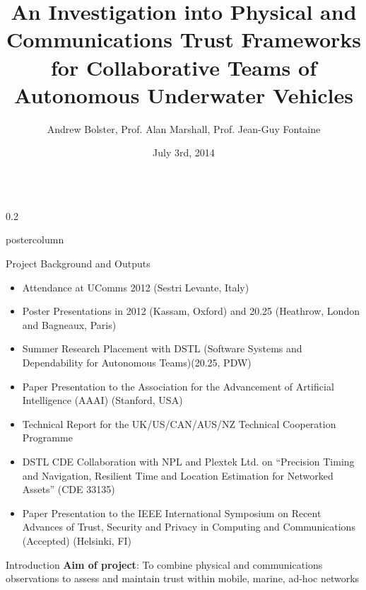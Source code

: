 \documentclass[final,hyperref={pdfpagelabels=false}]{beamer}
\title{\huge An Investigation into Physical and Communications Trust Frameworks \\
for Collaborative Teams of Autonomous Underwater Vehicles}
\author{Andrew Bolster, Prof. Alan Marshall, Prof. Jean-Guy Fontaine }
\institute[UoL]{Advanced Networks Research Group, University of Liverpool, UK}
\date[03/07/14]{July 3rd, 2014}
\def\colwidth{0.2\linewidth}
\begin{document}
\begin{frame}[fragile]
	\begin{columns}[T]
		
		\setlength{\parindent}{1em}
		\begin{column}{\colwidth}
			\begin{beamercolorbox}[center,wd=\textwidth]{postercolumn}
				\begin{minipage}[T]{.99\textwidth}  %
					\parbox[t]{\textwidth}{ %
						\begin{block}{Project Background and Outputs}
							\begin{itemize}
								\item Attendance at UComms 2012 (Sestri Levante, Italy)
								\item Poster Presentations in 2012 (Kassam, Oxford) and 20.25 (Heathrow, London and Bagneaux, Paris)
								\item Summer Research Placement with DSTL (Software Systems and Dependability for Autonomous Teams)(20.25, PDW)
								\item Paper Presentation to the Association for the Advancement of Artificial Intelligence (AAAI) (Stanford, USA) \cite{Bolster2014}
								\item Technical Report for the UK/US/CAN/AUS/NZ Technical Cooperation Programme \cite{Bolster2014a}
								\item DSTL CDE Collaboration with NPL and Plextek Ltd. on ``Precision Timing and Navigation, Resilient Time and Location Estimation for Networked Assets'' (CDE 33135)
                \item Paper Presentation to the IEEE International Symposium on Recent Advances of Trust, Security and Privacy in Computing and Communications (Accepted) (Helsinki, FI) \cite{Bolster2015}
							\end{itemize}
						\end{block}
												
						\begin{block}{Introduction}
							\textbf{Aim of project}: To combine physical and communications observations to assess and maintain trust within mobile, marine, ad-hoc networks
														

\end{block}}
\end{minipage}
\end{beamercolorbox}
\end{column}
\end{columns}
\end{frame}
\end{document}
